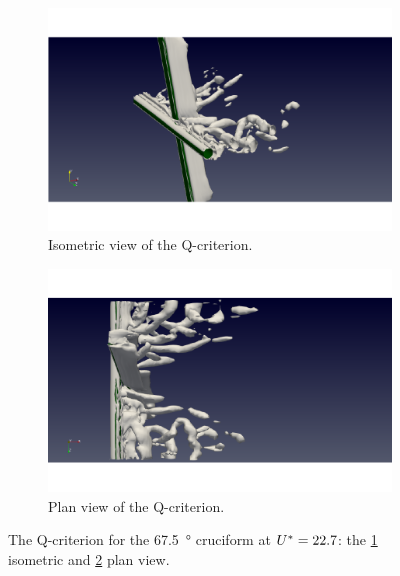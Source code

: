 \documentclass[oneside]{utmthesis}
\begin{document}
\begin{figure}
  \centering
  \begin{subfigure}[h]{0.9\textwidth}
    \includegraphics[width=\textwidth]{figs/qIso675U10}
    \caption{Isometric view of the Q-criterion.}
    \label{fig:qIso675U10}
  \end{subfigure}

  \begin{subfigure}[h]{0.9\textwidth}
    \includegraphics[width=\textwidth]{figs/qTop675U10}
    \caption{Plan view of the Q-criterion.}
    \label{fig:qTop675U10}
  \end{subfigure}

  \caption{The Q-criterion for the \SI{67.5}{\degree} cruciform at $U^{*} = 22.7$: the \ref{fig:qIso675U10} isometric and \ref{fig:qTop675U10} plan view.} \label{fig:qCrit675U10}
\end{figure}
\end{document}
